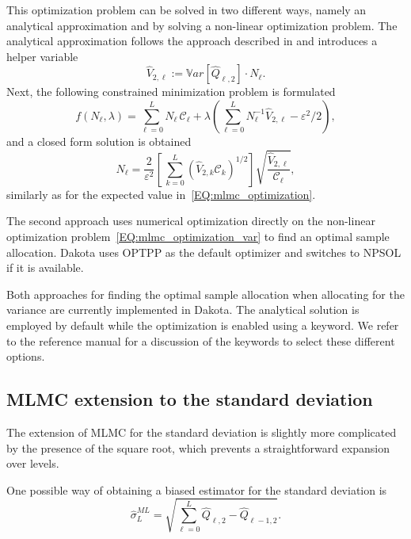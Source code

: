 This optimization problem can be solved in two different ways, namely an analytical approximation and by solving a non-linear optimization problem. The analytical approximation follows the approach described in \cite{Pisaroni2017} and introduces a helper variable
\begin{equation}
\hat{V}_{2, \ell} := \mathbb{V}ar\left[ \hat{Q}_{\ell,2} \right] \cdot N_{\ell}.
\end{equation}
Next, the following constrained minimization problem is formulated
\begin{equation}\label{EQ:mlmc_var_optimization_nobile}
 f(N_\ell,\lambda) = \sum_{\ell=0}^{L} N_\ell \, \mathcal{C}_{\ell} 
                   + \lambda \left( \sum_{\ell=0}^{L} N_\ell^{-1} \hat{V}_{2, \ell} - \varepsilon^2/2 \right),
\end{equation}
and a closed form solution is obtained
\begin{equation}\label{EQ: MLMC_nl_var_nobile}
N_{\ell} = \frac{2}{\varepsilon^2} \left[ \, \sum_{k=0}^L \left( \hat{V}_{2, k} \mathcal{C}_k \right)^{1/2} \right] 
               \sqrt{\frac{ \hat{V}_{2, \ell} }{\mathcal{C}_{\ell}}},
\end{equation}
similarly as for the expected value in~\eqref{EQ:mlmc_optimization}.

The second approach uses numerical optimization directly on the non-linear optimization problem~\eqref{EQ:mlmc_optimization_var} to find an optimal sample allocation. Dakota uses OPTPP as the default optimizer and switches to NPSOL if it is available. 

Both approaches for finding the optimal sample allocation when allocating for the variance are currently implemented in Dakota. The analytical solution is employed by default while the optimization is enabled using a keyword. We refer to the reference manual for a discussion of the keywords to select these different options.


\subsection{MLMC extension to the standard deviation}
The extension of MLMC for the standard deviation is slightly more complicated by the presence of the square root, which prevents a straightforward expansion over levels. 

One possible way of obtaining a biased estimator for the standard deviation is
\begin{equation}
\hat{\sigma}_L^{ML} = \sqrt{ \sum_{\ell=0}^L \hat{Q}_{\ell,2} - \hat{Q}_{\ell - 1,2} }.
\end{equation}


